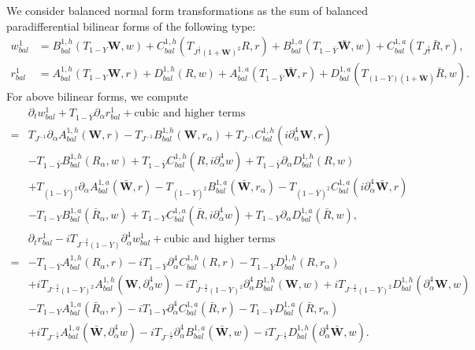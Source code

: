 \documentclass[10pt]{amsart}
\theoremstyle{remark}
\theoremstyle{definition}
\numberwithin{equation}{section}
\newcommand{\p}{\partial}
\newcommand{\al}{\alpha}
\newcommand{\f}{\frac}
\newcommand{\bw}{\mathbf{W}}
\begin{document}
We consider balanced normal form transformations as the sum of balanced paradifferential bilinear forms of the following type:
\begin{equation*} %
\begin{aligned}
w^1_{bal} &=B^{1,h}_{bal}\left(T_{1-Y}\bw ,w\right) + C^{1,h}_{bal}\left(T_{J^{\frac{1}{2}}(1+\bw)^2}R ,r\right)+ B^{1,a}_{bal}\left(T_{1-\bar{Y}}\bar{\bw},w\right) + C^{1,a}_{bal}\left(T_{J^{\frac{3}{2}}}\bar{R} ,r\right),\\
r^1_{bal} &=  A^{1,h}_{bal} \left( T_{1-Y}\bw,r\right) + D^{1,h}_{bal}\left(R,w\right)+A^{1,a}_{bal} \left(T_{1-\bar{Y}}\bar{\bw},r\right) + D^{1,a}_{bal}\left( T_{(1-Y)(1+\bar{\bw})}\bar{R},w\right).
\end{aligned}
\end{equation*}
For above bilinear forms, we compute
\begin{align*}
&\partial_t w^1_{bal}+T_{1-\bar{Y}} \partial_\alpha r^1_{bal} + \text{cubic and higher terms} \\
=& T_{J^{-1}}\partial_\alpha A^{1,h}_{bal}(\bw,r) -T_{J^{-1}}B^{1,h}_{bal}(\bw,r_{\al}) +  T_{J^{-1}}C^{1,h}_{bal}(i\p^4_{\al}\bw,r) \\
&-T_{1-\bar{Y}}B^{1,h}_{bal}( R_\alpha,w)+T_{1-\bar{Y}}C^{1,h}_{bal}(R,i\p_\al^4w) + T_{1-\bar{Y}}\partial_\alpha D^{1,h}_{bal}(R,w)\\
&+T_{(1-\bar{Y})^2}\p_{\al}A^{1,a}_{bal}(\bar{\bw},r)-T_{(1-\bar{Y})^2}B^{1,a}_{bal}(\bar{\bw},r_{\al})-T_{(1-\bar{Y})^2}C^{1,a}_{bal}(i\p^4_{\al}\bar{\bw},r)\\
 &-T_{1-Y}B^{1,a}_{bal}(\bar{R}_\alpha,w)+T_{1-Y}C^{1,a}_{bal}(\bar{R},i\p_\al^4w) + T_{1-Y}\partial_\alpha D^{1,a}_{bal}(\bar{R},w),\\
&\partial_t r^1_{bal}  -iT_{J^{-\frac{3}{2}}(1-Y)}\p_\al^4 w^1_{bal}+ \text{cubic and higher  terms} \\
=& -T_{1-\bar{Y}}A^{1,h}_{bal}( R_\alpha,r) - iT_{1-\bar{Y}}\partial_\alpha^4 C^{1,h}_{bal}(R,r) - T_{1-\bar{Y}}D^{1,h}_{bal}(R,r_\alpha)\\
&+ iT_{J^{-\frac{3}{2}}(1-Y)^2}A^{1,h}_{bal}(\bw,\p_\al^4w) -iT_{J^{-\frac{3}{2}}(1-Y)^2}\partial_\alpha^4 B^{1,h}_{bal}(\bw,w) +iT_{J^{-\frac{3}{2}}(1-Y)^2}D^{1,h}_{bal}(\p_\al^4\bw,w)\\
 &-T_{1-Y}A^{1,a}_{bal}(\bar{R}_\alpha,r) - iT_{1-Y}\partial_\alpha^4 C^{1,a}_{bal}( \bar{R},r) - T_{1-Y}D^{1,a}_{bal}(\bar{R},r_\alpha)\\
&+ iT_{J^{-\f52}}A^{1,a}_{bal}(\bar{\bw},\p_\al^4w) -iT_{J^{-\f52}}\partial_\alpha^4 B^{1,a}_{bal}(\bar{\bw},w) -iT_{J^{-\f52}}D^{1,h}_{bal}(\p_\al^4\bar{\bw},w).
\end{align*}
\end{document}
